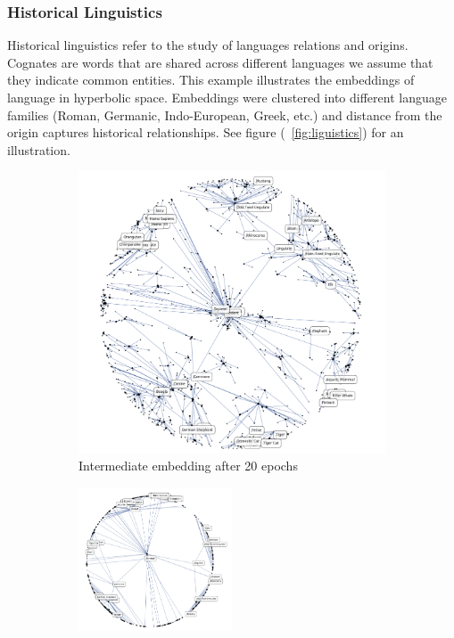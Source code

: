 \subsubsection{Historical Linguistics}
Historical linguistics refer to the study of languages relations and origins. Cognates are words that are shared across different languages we assume that they indicate common entities. This example illustrates the embeddings of language in hyperbolic space. Embeddings were clustered into different language families (Roman, Germanic, Indo-European, Greek, etc.) and distance from the origin captures historical relationships. See figure  (~\ref{fig:liguistics}) for an illustration.
\begin{figure}[htb]
    \begin{center}
    \begin{adjustbox}{minipage=0.5\textwidth,scale=0.5}
    \begin{subfigure}[b]{\columnwidth}
        \includegraphics[width=\textwidth]{figs/1-4.png}
            \caption{Intermediate embedding after 20 epochs}
            \label{fig:linguistics1}
        \vspace{0.7cm}
        \end{subfigure}
        \begin{subfigure}[b]{\columnwidth}
            \includegraphics[width=0.5\textwidth]{figs/1-5.png}

\end{subfigure}
\end{adjustbox}
\end{center}
\end{figure}
